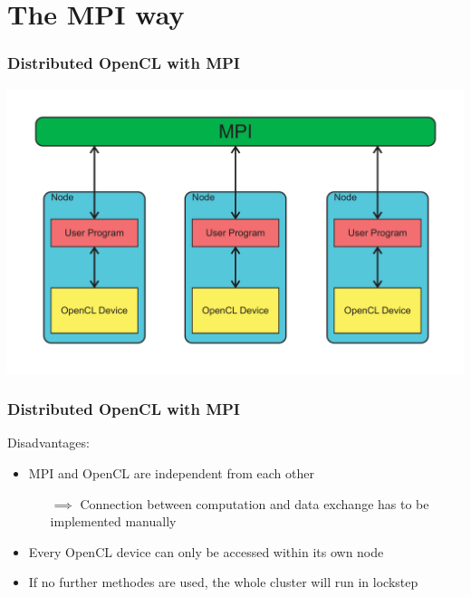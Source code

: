 \documentclass{beamer}
\begin{document}
\section{The MPI way}

\begin{frame}
    \frametitle{Distributed OpenCL with MPI}
    \begin{center}
        \includegraphics[width=\textwidth]{../2014-09-25_gputalk/mpi_opencl.pdf}
    \end{center}
\end{frame}

\begin{frame}
    \frametitle{Distributed OpenCL with MPI}
    Disadvantages:
    \begin{itemize}
        \item MPI and OpenCL are independent from each other
        \begin{itemize}
            \item[$\implies$] Connection between computation and data exchange
                              has to be implemented manually
        \end{itemize}
        \item Every OpenCL device can only be accessed within its own node
        \item If no further methodes are used, the whole cluster will run in lockstep
    \end{itemize}
\end{frame}
\end{document}
